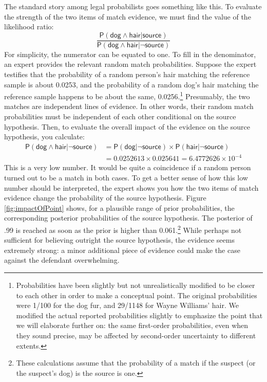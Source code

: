 \documentclass[
  10pt,
  dvipsnames,enabledeprecatedfontcommands]{scrartcl}
\newcommand{\pr}[1]{\mathsf{P}(#1)}
\newcommand{\s}[1]{\mbox{$\mathsf{#1}$}}
\begin{document}
The standard story among legal probabilists goes something like this. To
evaluate the strength of the two items of match evidence, we must find
the value of the likelihood ratio:
\[\frac{\pr{\s{dog}\wedge \s{hair} \vert \s{source}}}{\pr{\s{dog}\wedge \s{hair} \vert \neg \s{source}}}\]
For simplicity, the numerator can be equated to one. To fill in the
denominator, an expert provides the relevant random match probabilities.
Suppose the expert testifies that the probability of a random person's
hair matching the reference sample is about 0.0253, and the probability
of a random dog's hair matching the reference sample happens to be about
the same, 0.0256.\footnote{Probabilities have been slightly but not
  unrealistically modified to be closer to each other in order to make a
  conceptual point. The original probabilities were 1/100 for the dog
  fur, and 29/1148 for Wayne Williams' hair. We modified the actual
  reported probabilities slightly to emphasize the point that we will
  elaborate further on: the same first-order probabilities, even when
  they sound precise, may be affected by second-order uncertainty to
  different extents.} Presumably, the two matches are independent lines
of evidence. In other words, their random match probabilities must be
independent of each other conditional on the source hypothesis. Then, to
evaluate the overall impact of the evidence on the source hypothesis,
you calculate: \begin{align*}
\pr{\s{dog}\wedge \s{hair} \vert \neg \s{source}} & = \pr{\s{dog} \vert \neg \s{source}} \times \pr{\s{hair} \vert \neg \s{source}} \\
& =  0.0252613 \times  0.025641 = \ensuremath{6.4772626\times 10^{-4}}
\end{align*} This is a very low number. It would be quite a coincidence
if a random person turned out to be a match in both cases. To get a
better sense of how this low number should be interpreted, the expert
shows you how the two items of match evidence change the probability of
the source hypothesis. Figure \ref{fig:impactOfPoint} shows, for a
plausible range of prior probabilities, the corresponding posterior
probabilities of the source hypothesis. The posterior of .99 is reached
as soon as the prior is higher than 0.061.\footnote{These calculations
  assume that the probability of a match if the suspect (or the
  suspect's dog) is the source is one.} While perhaps not sufficient for
believing outright the source hypothesis, the evidence seems extremely
strong: a minor additional piece of evidence could make the case against
the defendant overwhelming.
\end{document}
